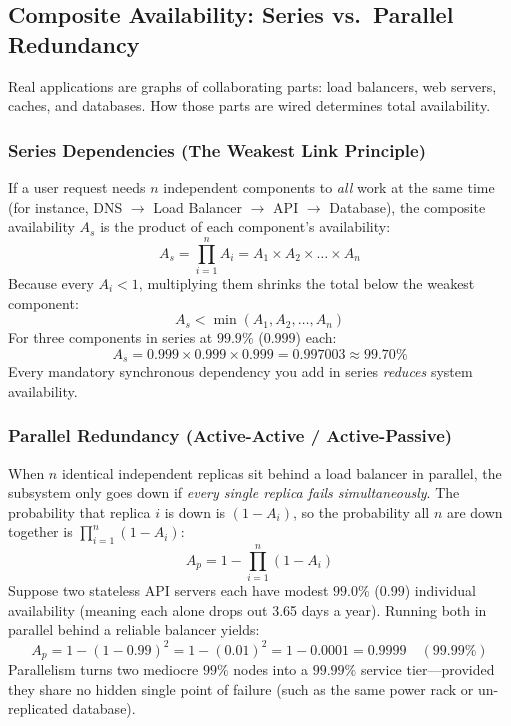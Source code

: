 \subsection{Composite Availability: Series vs.\ Parallel Redundancy}

Real applications are graphs of collaborating parts: load balancers, web servers, caches, and databases. How those parts are wired determines total availability.

\subsubsection{Series Dependencies (The Weakest Link Principle)}
If a user request needs $n$ independent components to \emph{all} work at the same time (for instance, DNS $\rightarrow$ Load Balancer $\rightarrow$ API $\rightarrow$ Database), the composite availability $A_s$ is the product of each component's availability:
\begin{equation}
A_s = \prod_{i=1}^n A_i = A_1 \times A_2 \times \dots \times A_n
\end{equation}
Because every $A_i < 1$, multiplying them shrinks the total below the weakest component:
\begin{equation}
A_s < \min(A_1, A_2, \dots, A_n)
\end{equation}
For three components in series at $99.9\%$ ($0.999$) each:
\begin{equation}
A_s = 0.999 \times 0.999 \times 0.999 = 0.997003 \approx 99.70\%
\end{equation}
Every mandatory synchronous dependency you add in series \emph{reduces} system availability.

\subsubsection{Parallel Redundancy (Active-Active / Active-Passive)}
When $n$ identical independent replicas sit behind a load balancer in parallel, the subsystem only goes down if \emph{every single replica fails simultaneously}. The probability that replica $i$ is down is $(1 - A_i)$, so the probability all $n$ are down together is $\prod_{i=1}^n (1 - A_i)$:
\begin{equation}
A_p = 1 - \prod_{i=1}^n (1 - A_i)
\end{equation}
Suppose two stateless API servers each have modest $99.0\%$ ($0.99$) individual availability (meaning each alone drops out 3.65 days a year). Running both in parallel behind a reliable balancer yields:
\begin{equation}
A_p = 1 - (1 - 0.99)^2 = 1 - (0.01)^2 = 1 - 0.0001 = 0.9999 \quad (99.99\%)
\end{equation}
Parallelism turns two mediocre $99\%$ nodes into a $99.99\%$ service tier---provided they share no hidden single point of failure (such as the same power rack or un-replicated database).

